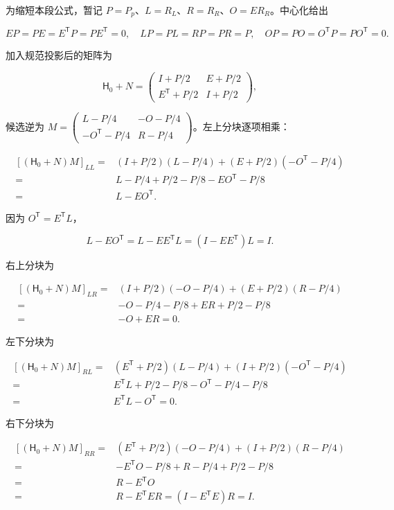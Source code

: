 \documentclass[11pt,a4paper]{article}
\begin{document}
为缩短本段公式，暂记 \(P=P_p\)、\(L=R_L\)、\(R=R_R\)、\(O=ER_R\)。中心化给出

\[EP=PE=E^{\mathsf T}P=PE^{\mathsf T}=0,\quad
LP=PL=RP=PR=P,\quad OP=PO=O^{\mathsf T}P=PO^{\mathsf T}=0.\]

加入规范投影后的矩阵为

\[\mathsf H_0+N=\begin{pmatrix}I+P/2&E+P/2\\E^{\mathsf T}+P/2&I+P/2\end{pmatrix},\]

候选逆为 \(M=\left(\begin{smallmatrix}L-P/4&-O-P/4\\-O^{\mathsf T}-P/4&R-P/4\end{smallmatrix}\right)\)。左上分块逐项相乘：

\[\begin{aligned}
[(\mathsf H_0+N)M]_{LL}
={}&(I+P/2)(L-P/4)+(E+P/2)(-O^{\mathsf T}-P/4)\\
={}&L-P/4+P/2-P/8-EO^{\mathsf T}-P/8\\
={}&L-EO^{\mathsf T}.
\end{aligned}\]

因为 \(O^{\mathsf T}=E^{\mathsf T}L\)，

\[L-EO^{\mathsf T}=L-EE^{\mathsf T}L=(I-EE^{\mathsf T})L=I.\]

右上分块为

\[\begin{aligned}
[(\mathsf H_0+N)M]_{LR}
={}&(I+P/2)(-O-P/4)+(E+P/2)(R-P/4)\\
={}&-O-P/4-P/8+ER+P/2-P/8\\
={}&-O+ER=0.
\end{aligned}\]

左下分块为

\[\begin{aligned}
[(\mathsf H_0+N)M]_{RL}
={}&(E^{\mathsf T}+P/2)(L-P/4)+(I+P/2)(-O^{\mathsf T}-P/4)\\
={}&E^{\mathsf T}L+P/2-P/8-O^{\mathsf T}-P/4-P/8\\
={}&E^{\mathsf T}L-O^{\mathsf T}=0.
\end{aligned}\]

右下分块为

\[\begin{aligned}
[(\mathsf H_0+N)M]_{RR}
={}&(E^{\mathsf T}+P/2)(-O-P/4)+(I+P/2)(R-P/4)\\
={}&-E^{\mathsf T}O-P/8+R-P/4+P/2-P/8\\
={}&R-E^{\mathsf T}O\\
={}&R-E^{\mathsf T}ER=(I-E^{\mathsf T}E)R=I.
\end{aligned}\]
\end{document}
